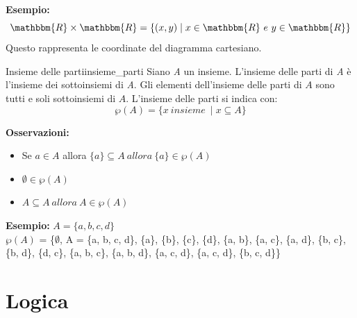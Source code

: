 \documentclass[12pt, letterpaper]{report}
\newcounter{definition}
\newcommand{\nmu}{}
\begin{document}
	\textbf{Esempio: }
	\[
		\mathbbm{R} \times \mathbbm{R} = \{(x, y) \mid x \in \mathbbm{R} \ e \ y \in \mathbbm{R}\}
	\]
	Questo rappresenta le coordinate del diagramma cartesiano.
	\begin{definition}{\nmu Insieme delle parti}{insieme_parti}
		Siano \textit{A} un insieme. L'insieme delle parti di \textit{A} è l'insieme dei sottoinsiemi di \textit{A}. Gli elementi dell'insieme delle parti di $A$ sono tutti e soli sottoinsiemi di $A$.
		L'insieme delle parti si indica con:
		\[
		\wp(A) = \{x \ insieme \ \mid x \subseteq A\}
		\]
	\end{definition}
	\textbf{Osservazioni: }
	\begin{itemize}
		\item Se $a \in A$ allora $\{a\} \subseteq A \ allora \ \{a\} \in \wp(A)$
		\item $\emptyset \in \wp(A)$
		\item $A \subseteq A \ allora \ A \in \wp(A)$
	\end{itemize}
	\textbf{Esempio:}
	$A = \{a, b, c, d\}$
	\\ $\wp(A)$ = \{$\emptyset$, A = \{a, b, c, d\}, \{a\}, \{b\}, \{c\}, \{d\}, \{a, b\}, \{a, c\}, \{a, d\}, \{b, c\},\{b, d\}, \{d, c\}, \{a, b, c\}, \{a, b, d\}, \{a, c, d\}, \{a, c, d\}, \{b, c, d\}\}

	\chapter{Logica}
\end{document}
